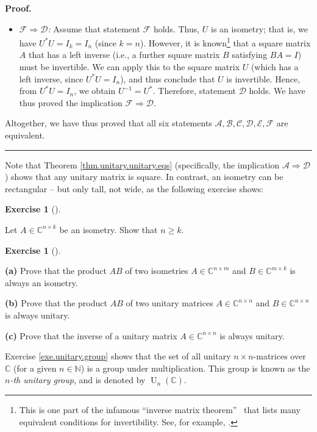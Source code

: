 \documentclass[numbers=enddot,12pt,final,onecolumn,notitlepage]{scrartcl}%
\newcounter{exer}
\numberwithin{exer}{subsection}
\theoremstyle{definition}
\newtheorem{exmp}[exer]{Exercise}
\newenvironment{exercise}[1][]
{\begin{exmp}[#1]\begin{leftbar}}
{\end{leftbar}\end{exmp}}
\newenvironment{proof}[1][Proof]{\noindent\textbf{#1.} }{\ \rule{0.5em}{0.5em}}
\begin{document}
\begin{proof}
\begin{itemize}
\item $\mathcal{F}\Longrightarrow\mathcal{D}$\textit{:} Assume that statement
$\mathcal{F}$ holds. Thus, $U$ is an isometry; that is, we have $U^{\ast
}U=I_{k}=I_{n}$ (since $k=n$). However, it is known\footnote{This is one part
of the infamous \textquotedblleft inverse matrix theorem\textquotedblright%
\ that lists many equivalent conditions for invertibility. See, for example,
\cite[Chapter 2, Proposition 3.8]{Treil15}.} that a square matrix $A$ that has
a left inverse (i.e., a further square matrix $B$ satisfying $BA=I$) must be
invertible. We can apply this to the square matrix $U$ (which has a left
inverse, since $U^{\ast}U=I_{n}$), and thus conclude that $U$ is invertible.
Hence, from $U^{\ast}U=I_{n}$, we obtain $U^{-1}=U^{\ast}$. Therefore,
statement $\mathcal{D}$ holds. We have thus proved the implication
$\mathcal{F}\Longrightarrow\mathcal{D}$.
\end{itemize}

Altogether, we have thus proved that all six statements $\mathcal{A}%
,\mathcal{B},\mathcal{C},\mathcal{D},\mathcal{E},\mathcal{F}$ are equivalent.
\end{proof}

Note that Theorem \ref{thm.unitary.unitary.eqs} (specifically, the implication
$\mathcal{A}\Longrightarrow\mathcal{D}$) shows that any unitary matrix is
square. In contrast, an isometry can be rectangular -- but only tall, not
wide, as the following exercise shows:

\begin{exercise}
\label{exe.unitary.isometry-tall} Let $A\in\mathbb{C}^{n\times k}$ be
an isometry. Show that $n\geq k$.
\end{exercise}

\begin{exercise}
\label{exe.unitary.group} \textbf{(a)} Prove that the product $AB$ of
two isometries $A\in\mathbb{C}^{n\times m}$ and $B\in\mathbb{C}^{m\times k}$
is always an isometry. \medskip

\textbf{(b)} Prove that the product $AB$ of two unitary matrices
$A\in\mathbb{C}^{n\times n}$ and $B\in\mathbb{C}^{n\times n}$ is always
unitary. \medskip

\textbf{(c)} Prove that the inverse of a unitary matrix $A\in\mathbb{C}%
^{n\times n}$ is always unitary.
\end{exercise}

Exercise \ref{exe.unitary.group} shows that the set of all unitary $n\times
n$-matrices over $\mathbb{C}$ (for a given $n\in\mathbb{N}$) is a group under
multiplication. This group is known as the $n$\emph{-th unitary group}, and is
denoted by $\operatorname*{U}\nolimits_{n}\left(  \mathbb{C}\right)  $.
\end{document}
